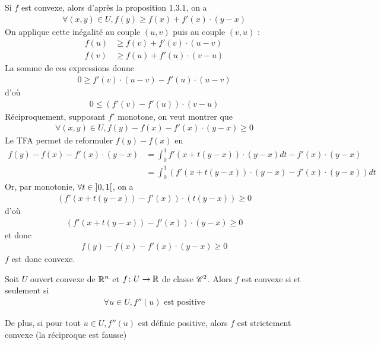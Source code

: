 \documentclass[french,a4paper,10pt]{article}
\begin{document}
	\begin{myproof}
		Si $f$ est convexe, alors d'après la proposition $1.3.1$, on a
			\[\begin{aligned}
				\forall (x,y)\in U,f(y)\ge f(x)+f'(x)\cdot(y-x)
			\end{aligned}\]
		On applique cette inégalité au couple $(u,v)$ puis au couple $(v,u)$ :
			\[\begin{aligned}
				f(u)&\ge f(v)+f'(v)\cdot (u-v)\\
				f(v)&\ge f(u)+f'(u)\cdot (v-u)
			\end{aligned}\]
		La somme de ces expressions donne
			\[\begin{aligned}
				0\ge f'(v)\cdot(u-v)-f'(u)\cdot(u-v)
			\end{aligned}\]
		d'où
			\[\begin{aligned}
				0\le (f'(v)-f'(u))\cdot(v-u)
			\end{aligned}\]
		Réciproquement, supposant $f'$ monotone, on veut montrer que
			\[\begin{aligned}
				\forall (x,y)\in U,f(y)-f(x)-f'(x)\cdot(y-x)\ge 0
			\end{aligned}\]
		Le TFA permet de reformuler $f(y)-f(x)$ en
			\[\begin{aligned}
				f(y)-f(x)-f'(x)\cdot(y-x)&=\int_0^1 f'(x+t(y-x))\cdot(y-x)dt -f'(x)\cdot(y-x)\\
				&=\int_0^1 (f'(x+t(y-x))\cdot(y-x) -f'(x)\cdot(y-x))dt
			\end{aligned}\]
		Or, par monotonie, $\forall t\in\mathopen{]}0,1\mathclose{[}$, on a
			\[\begin{aligned}
				(f'(x+t(y-x))-f'(x))\cdot(t(y-x))\ge 0
			\end{aligned}\]
		d'où
			\[\begin{aligned}
				(f'(x+t(y-x))-f'(x))\cdot(y-x)\ge 0
			\end{aligned}\]
		et donc
			\[\begin{aligned}
				f(y)-f(x)-f'(x)\cdot(y-x)\ge 0
			\end{aligned}\]
		$f$ est donc convexe.
	\end{myproof}
	
	\begin{oc-proposition}
		Soit $U$ ouvert convexe de $\mathbb{R}^n$ et $f\colon U\to\mathbb{R}$ de classe $\mathscr{C}^2$. Alors $f$ est convexe si et seulement si 
			\[\begin{aligned}
				\forall u\in U,f''(u)\text{ est positive}
			\end{aligned}\]
			
		De plus, si pour tout $u\in U,f''(u)$ est définie positive, alors $f$ est strictement convexe (la réciproque est fausse)
	\end{oc-proposition}
	
\end{document}
